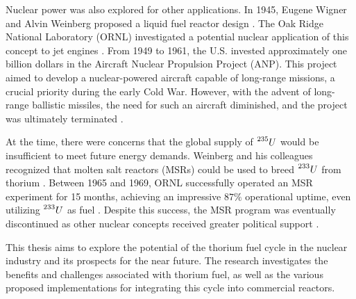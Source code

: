Nuclear power was also explored for other applications. In 1945, Eugene Wigner and Alvin Weinberg proposed a liquid fuel reactor design \cite{TMSR_book}. The Oak Ridge National Laboratory (ORNL) investigated a potential nuclear application of this concept to jet engines \cite{TMSR_book}. From 1949 to 1961, the U.S. invested approximately one billion dollars in the Aircraft Nuclear Propulsion Project (ANP). This project aimed to develop a nuclear-powered aircraft capable of long-range missions, a crucial priority during the early Cold War. However, with the advent of long-range ballistic missiles, the need for such an aircraft diminished, and the project was ultimately terminated \cite{Lamarsh_Baratta_2009}.

At the time, there were concerns that the global supply of \(\prescript{235}{}{U}\) would be insufficient to meet future energy demands. Weinberg and his colleagues recognized that molten salt reactors (MSRs) could be used to breed \(\prescript{233}{}{U}\) from thorium \cite{TMSR_book}. Between 1965 and 1969, ORNL successfully operated an MSR experiment for 15 months, achieving an impressive \(87\%\) operational uptime, even utilizing \(\prescript{233}{}{U}\) as fuel \cite{TMSR_book}. Despite this success, the MSR program was eventually discontinued as other nuclear concepts received greater political support \cite{TMSR_book}.

This thesis aims to explore the potential of the thorium fuel cycle in the nuclear industry and its prospects for the near future. The research investigates the benefits and challenges associated with thorium fuel, as well as the various proposed implementations for integrating this cycle into commercial reactors.


